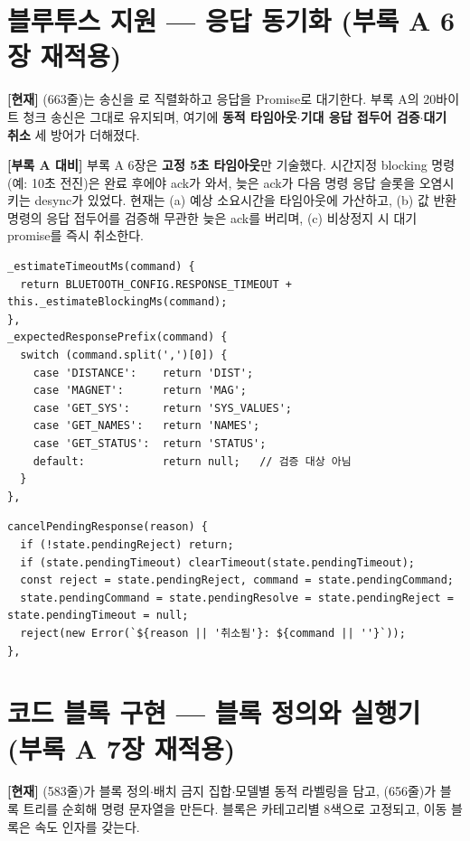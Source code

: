 \section{블루투스 지원 --- 응답 동기화 (부록 A 6장 재적용)}
\textbf{[현재]} (663줄)는 송신을 로 직렬화하고 응답을
Promise로 대기한다. 부록 A의 20바이트 청크 송신은 그대로 유지되며, 여기에 \textbf{동적
타임아웃$\cdot$기대 응답 접두어 검증$\cdot$대기 취소} 세 방어가 더해졌다.

\smallskip
\noindent\textbf{[부록 A 대비]} 부록 A 6장은 \textbf{고정 5초 타임아웃}만 기술했다. 시간지정
blocking 명령(예: 10초 전진)은 완료 후에야 ack가 와서, 늦은 ack가 다음 명령 응답 슬롯을
오염시키는 desync가 있었다. 현재는 (a) 예상 소요시간을 타임아웃에 가산하고, (b) 값 반환
명령의 응답 접두어를 검증해 무관한 늦은 ack를 버리며, (c) 비상정지 시 대기 promise를 즉시
취소한다.

\begin{verbatim}
_estimateTimeoutMs(command) {
  return BLUETOOTH_CONFIG.RESPONSE_TIMEOUT + this._estimateBlockingMs(command);
},
_expectedResponsePrefix(command) {
  switch (command.split(',')[0]) {
    case 'DISTANCE':    return 'DIST';
    case 'MAGNET':      return 'MAG';
    case 'GET_SYS':     return 'SYS_VALUES';
    case 'GET_NAMES':   return 'NAMES';
    case 'GET_STATUS':  return 'STATUS';
    default:            return null;   // 검증 대상 아님
  }
},
\end{verbatim}

\begin{verbatim}
cancelPendingResponse(reason) {
  if (!state.pendingReject) return;
  if (state.pendingTimeout) clearTimeout(state.pendingTimeout);
  const reject = state.pendingReject, command = state.pendingCommand;
  state.pendingCommand = state.pendingResolve = state.pendingReject = state.pendingTimeout = null;
  reject(new Error(`${reason || '취소됨'}: ${command || ''}`));
},
\end{verbatim}

\section{코드 블록 구현 --- 블록 정의와 실행기 (부록 A 7장 재적용)}
\textbf{[현재]} (583줄)가 블록 정의$\cdot$배치 금지 집합$\cdot$모델별 동적
라벨링을 담고, (656줄)가 블록 트리를 순회해 명령 문자열을 만든다.
블록은 카테고리별 8색으로 고정되고, 이동 블록은 속도 인자를 갖는다.

